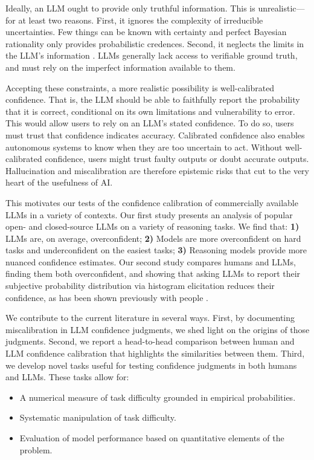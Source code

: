 \documentclass{article}
\begin{document}
Ideally, an LLM ought to provide only truthful information. This is unrealistic---for at least two reasons. First, it ignores the complexity of irreducible uncertainties. Few things can be known with certainty and perfect Bayesian rationality only provides probabilistic credences. Second, it neglects the limits in the LLM's information \citep{Tripathi2025}. LLMs generally lack access to verifiable ground truth, and must rely on the imperfect information available to them. 

Accepting these constraints, a more realistic possibility is well-calibrated confidence. That is, the LLM should be able to faithfully report the probability that it is correct, conditional on its own limitations and vulnerability to error. This would allow users to rely on an LLM's stated confidence. To do so, users must trust that confidence indicates accuracy. Calibrated confidence also enables autonomous systems to know when they are too uncertain to act. Without well-calibrated confidence, users might trust faulty outputs or doubt accurate outputs. Hallucination and miscalibration are therefore epistemic risks that cut to the very heart of the usefulness of AI.

This motivates our tests of the confidence calibration of commercially available LLMs in a variety of contexts. Our first study presents an analysis of popular open- and closed-source LLMs on a variety of reasoning tasks. We find that: \textbf{1) }LLMs are, on average, overconfident; \textbf{2) }Models are more overconfident on hard tasks and underconfident on the easiest tasks; \textbf{3)} Reasoning models provide more nuanced confidence estimates. Our second study compares humans and LLMs, finding them both overconfident, and showing that asking LLMs to report their subjective probability distribution via histogram elicitation reduces their confidence, as has been shown previously with people \citep{Moore_Tenney_Haran_2015}.

We contribute to the current literature in several ways. First, by documenting miscalibration in LLM confidence judgments, we shed light on the origins of those judgments. Second, we report a head-to-head comparison between human and LLM confidence calibration that highlights the similarities between them. Third, we develop novel tasks useful for testing confidence judgments in both humans and LLMs. These tasks allow for:
\begin{itemize}
    \setlength\itemsep{0em}  %
    \setlength\parskip{0em}  %
    \item A numerical measure of task difficulty grounded in empirical probabilities.
    \item Systematic manipulation of task difficulty.
    \item Evaluation of model performance based on quantitative elements of the problem.
\end{itemize}
\end{document}
